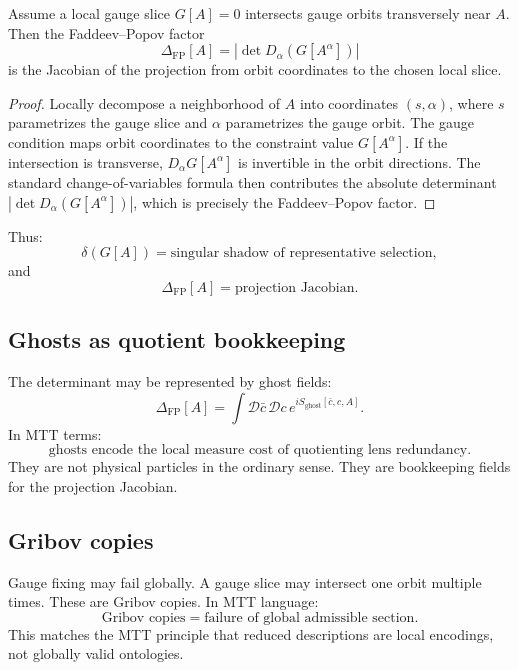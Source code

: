 \documentclass[11pt]{article}
\begin{document}
\begin{proposition}\label{prop:fp}
Assume a local gauge slice \(G[A]=0\) intersects gauge orbits transversely near \(A\).  Then
the Faddeev--Popov factor
\begin{equation}
\Delta_{\mathrm{FP}}[A]
=\left|\det D_\alpha(G[A^\alpha])\right|
\end{equation}
is the Jacobian of the projection from orbit coordinates to the chosen local slice.
\end{proposition}

\begin{proof}
Locally decompose a neighborhood of \(A\) into coordinates \((s,\alpha)\), where \(s\)
parametrizes the gauge slice and \(\alpha\) parametrizes the gauge orbit.  The gauge condition
maps orbit coordinates to the constraint value \(G[A^\alpha]\).  If the intersection is
transverse, \(D_\alpha G[A^\alpha]\) is invertible in the orbit directions.  The standard
change-of-variables formula then contributes the absolute determinant
\(\left|\det D_\alpha(G[A^\alpha])\right|\), which is precisely the Faddeev--Popov factor.
\end{proof}

Thus:
\[
\boxed{\delta(G[A])=\text{singular shadow of representative selection},}
\]
and
\[
\boxed{\Delta_{\mathrm{FP}}[A]=\text{projection Jacobian}.}
\]

\subsection{Ghosts as quotient bookkeeping}

The determinant may be represented by ghost fields:
\begin{equation}
\Delta_{\mathrm{FP}}[A]=
\int \mathcal D\bar c\,\mathcal Dc\,e^{iS_{\mathrm{ghost}}[\bar c,c,A]}.
\end{equation}
In MTT terms:
\[
\boxed{\text{ghosts encode the local measure cost of quotienting lens redundancy}.}
\]
They are not physical particles in the ordinary sense.  They are bookkeeping fields for the
projection Jacobian.

\subsection{Gribov copies}

Gauge fixing may fail globally. A gauge slice may intersect one orbit multiple times.  These
are Gribov copies. In MTT language:
\[
\boxed{\text{Gribov copies}=\text{failure of global admissible section}.}
\]
This matches the MTT principle that reduced descriptions are local encodings, not globally
valid ontologies.
\end{document}
